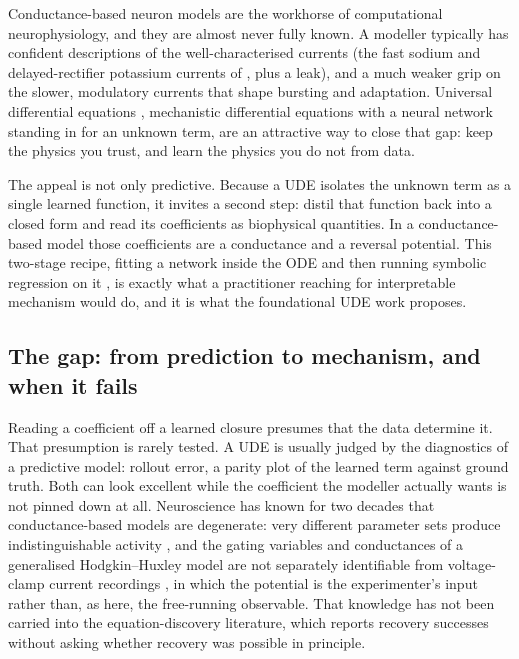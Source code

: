 \documentclass{article}
\begin{document}
Conductance-based neuron models are the workhorse of computational
neurophysiology, and they are almost never fully known. A modeller typically
has confident descriptions of the well-characterised currents (the fast sodium
and delayed-rectifier potassium currents of \citet{hodgkin1952}, plus a leak), and a
much weaker grip on the slower, modulatory currents that shape bursting and
adaptation. Universal differential equations
\citep{rackauckas2020universal}, mechanistic differential equations with a
neural network standing in for an unknown term, are an attractive way to close
that gap: keep the physics you trust, and learn the physics you do not from data.

The appeal is not only predictive. Because a UDE isolates the unknown term as a
single learned function, it invites a second step: distil that function back
into a closed form and read its coefficients as biophysical quantities. In a
conductance-based model those coefficients are a conductance and a reversal
potential. This two-stage recipe, fitting a network inside the ODE and then
running symbolic regression on it \citep{brunton2016sindy}, is exactly what a
practitioner reaching for interpretable mechanism would do, and it is what the
foundational UDE work proposes.

\subsection{The gap: from prediction to mechanism, and when it fails}

Reading a coefficient off a learned closure presumes that the data determine it.
That presumption is rarely tested. A UDE is usually judged by the diagnostics of
a predictive model: rollout error, a parity plot of the learned term against
ground truth. Both can look excellent while the coefficient the modeller
actually wants is not pinned down at all. Neuroscience has known for two decades
that conductance-based models are degenerate: very different parameter sets
produce indistinguishable activity \citep{prinz2004,marder2011}, and the gating
variables and conductances of a generalised Hodgkin--Huxley model are not
separately identifiable from voltage-clamp current recordings \citep{walch2016}, in which the potential is the experimenter's input rather than, as here, the free-running observable. That knowledge has not
been carried into the equation-discovery literature, which reports recovery
successes without asking whether recovery was possible in principle.
\end{document}
